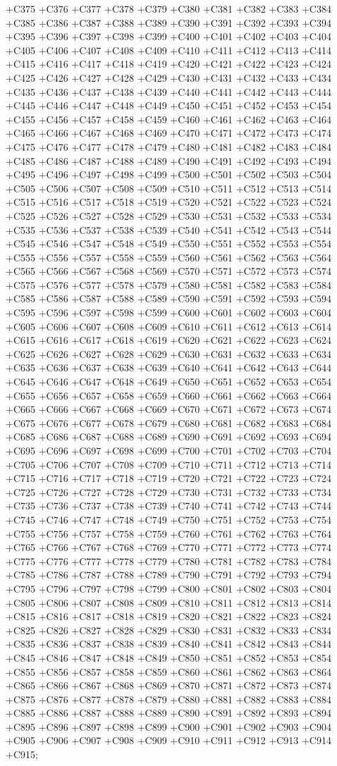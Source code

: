  +C375 +C376 +C377 +C378 +C379 +C380 +C381 +C382 +C383 +C384 +C385 +C386 +C387 +C388 +C389 +C390 +C391
 +C392 +C393 +C394 +C395 +C396 +C397 +C398 +C399 +C400 +C401 +C402 +C403 +C404 +C405 +C406 +C407 +C408
 +C409 +C410 +C411 +C412 +C413 +C414 +C415 +C416 +C417 +C418 +C419 +C420 +C421 +C422 +C423 +C424 +C425
 +C426 +C427 +C428 +C429 +C430 +C431 +C432 +C433 +C434 +C435 +C436 +C437 +C438 +C439 +C440 +C441 +C442
 +C443 +C444 +C445 +C446 +C447 +C448 +C449 +C450 +C451 +C452 +C453 +C454 +C455 +C456 +C457 +C458 +C459
 +C460 +C461 +C462 +C463 +C464 +C465 +C466 +C467 +C468 +C469 +C470 +C471 +C472 +C473 +C474 +C475 +C476
 +C477 +C478 +C479 +C480 +C481 +C482 +C483 +C484 +C485 +C486 +C487 +C488 +C489 +C490 +C491 +C492 +C493
 +C494 +C495 +C496 +C497 +C498 +C499 +C500 +C501 +C502 +C503 +C504 +C505 +C506 +C507 +C508 +C509 +C510
 +C511 +C512 +C513 +C514 +C515 +C516 +C517 +C518 +C519 +C520 +C521 +C522 +C523 +C524 +C525 +C526 +C527
 +C528 +C529 +C530 +C531 +C532 +C533 +C534 +C535 +C536 +C537 +C538 +C539 +C540 +C541 +C542 +C543 +C544
 +C545 +C546 +C547 +C548 +C549 +C550 +C551 +C552 +C553 +C554 +C555 +C556 +C557 +C558 +C559 +C560 +C561
 +C562 +C563 +C564 +C565 +C566 +C567 +C568 +C569 +C570 +C571 +C572 +C573 +C574 +C575 +C576 +C577 +C578
 +C579 +C580 +C581 +C582 +C583 +C584 +C585 +C586 +C587 +C588 +C589 +C590 +C591 +C592 +C593 +C594 +C595
 +C596 +C597 +C598 +C599 +C600 +C601 +C602 +C603 +C604 +C605 +C606 +C607 +C608 +C609 +C610 +C611 +C612
 +C613 +C614 +C615 +C616 +C617 +C618 +C619 +C620 +C621 +C622 +C623 +C624 +C625 +C626 +C627 +C628 +C629
 +C630 +C631 +C632 +C633 +C634 +C635 +C636 +C637 +C638 +C639 +C640 +C641 +C642 +C643 +C644 +C645 +C646
 +C647 +C648 +C649 +C650 +C651 +C652 +C653 +C654 +C655 +C656 +C657 +C658 +C659 +C660 +C661 +C662 +C663
 +C664 +C665 +C666 +C667 +C668 +C669 +C670 +C671 +C672 +C673 +C674 +C675 +C676 +C677 +C678 +C679 +C680
 +C681 +C682 +C683 +C684 +C685 +C686 +C687 +C688 +C689 +C690 +C691 +C692 +C693 +C694 +C695 +C696 +C697
 +C698 +C699 +C700 +C701 +C702 +C703 +C704 +C705 +C706 +C707 +C708 +C709 +C710 +C711 +C712 +C713 +C714
 +C715 +C716 +C717 +C718 +C719 +C720 +C721 +C722 +C723 +C724 +C725 +C726 +C727 +C728 +C729 +C730 +C731
 +C732 +C733 +C734 +C735 +C736 +C737 +C738 +C739 +C740 +C741 +C742 +C743 +C744 +C745 +C746 +C747 +C748
 +C749 +C750 +C751 +C752 +C753 +C754 +C755 +C756 +C757 +C758 +C759 +C760 +C761 +C762 +C763 +C764 +C765
 +C766 +C767 +C768 +C769 +C770 +C771 +C772 +C773 +C774 +C775 +C776 +C777 +C778 +C779 +C780 +C781 +C782
 +C783 +C784 +C785 +C786 +C787 +C788 +C789 +C790 +C791 +C792 +C793 +C794 +C795 +C796 +C797 +C798 +C799
 +C800 +C801 +C802 +C803 +C804 +C805 +C806 +C807 +C808 +C809 +C810 +C811 +C812 +C813 +C814 +C815 +C816
 +C817 +C818 +C819 +C820 +C821 +C822 +C823 +C824 +C825 +C826 +C827 +C828 +C829 +C830 +C831 +C832 +C833
 +C834 +C835 +C836 +C837 +C838 +C839 +C840 +C841 +C842 +C843 +C844 +C845 +C846 +C847 +C848 +C849 +C850
 +C851 +C852 +C853 +C854 +C855 +C856 +C857 +C858 +C859 +C860 +C861 +C862 +C863 +C864 +C865 +C866 +C867
 +C868 +C869 +C870 +C871 +C872 +C873 +C874 +C875 +C876 +C877 +C878 +C879 +C880 +C881 +C882 +C883 +C884
 +C885 +C886 +C887 +C888 +C889 +C890 +C891 +C892 +C893 +C894 +C895 +C896 +C897 +C898 +C899 +C900 +C901
 +C902 +C903 +C904 +C905 +C906 +C907 +C908 +C909 +C910 +C911 +C912 +C913 +C914 +C915; \\

